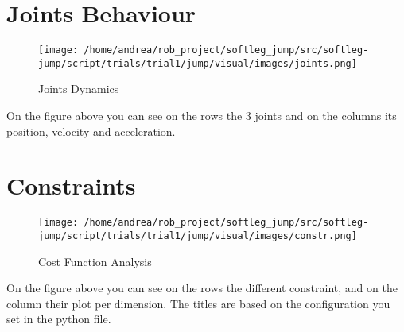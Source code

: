 \documentclass{article}%
\begin{document}
%
\section{Joints Behaviour}%
\label{sec:JointsBehaviour}%


\begin{figure}[h!]%
\centering%
\texttt{[image: /home/andrea/rob\_project/softleg\_jump/src/softleg-jump/script/trials/trial1/jump/visual/images/joints.png]}%
\caption{Joints Dynamics}%
\end{figure}

%
On the figure above you can see on the rows the 3 joints and on the columns its position, velocity and acceleration.

%
\pagebreak%
\section{Constraints}%
\label{sec:Constraints}%


\begin{figure}[h!]%
\centering%
\texttt{[image: /home/andrea/rob\_project/softleg\_jump/src/softleg-jump/script/trials/trial1/jump/visual/images/constr.png]}%
\caption{Cost Function Analysis}%
\end{figure}

%
On the figure above you can see on the rows the different constraint, and on the column their plot per dimension. The titles are based on the configuration you set in the python file.

%
\end{document}
